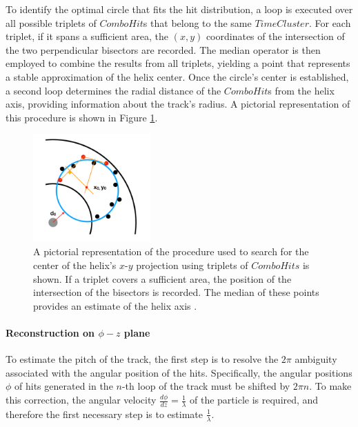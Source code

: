 To identify the optimal circle that fits the hit distribution, 
a loop is executed over all possible triplets of 
$ComboHit$s that belong to the same $TimeCluster$. 
For each triplet, if it spans a sufficient area, the 
$(x, y)$ coordinates of the intersection of the two 
perpendicular bisectors are recorded. The median operator 
is then employed to combine the results from all triplets, 
yielding a point that represents a stable approximation of 
the helix center. Once the circle's center is established, 
a second loop determines the radial distance of the 
$ComboHit$s from the helix axis, providing information 
about the track's radius. A pictorial representation of 
this procedure is shown in Figure \ref{fig:trkpatrec}.
\begin{figure}[!h]
    \centering
    \includegraphics[width =0.4\textwidth]{figures/png/Screenshot_20240810_160341.png}
    \caption[Procedure adopted to search for the center of the $x-y$
    projection of the helix.]{A pictorial representation of the procedure 
    used to search for the center of the helix's $x$-$y$ projection using 
    triplets of $ComboHits$ is shown. If a triplet covers a sufficient area, 
    the position of the intersection of the 
    bisectors is recorded. The median of these points provides an 
    estimate of the helix axis \cite{trkpat}.}
    \label{fig:trkpatrec}
\end{figure}
\paragraph{Reconstruction on $\phi-z$ plane}
To estimate the pitch of the track, the first step 
is to resolve the $2\pi$ ambiguity associated with the 
angular position of the hits. Specifically, the angular 
positions $\phi$ of hits generated in the $n$-th loop of 
the track must be shifted by $2\pi n$. To make this 
correction, the angular velocity $\frac{d\phi}{dz} = \frac{1}{\lambda}$ 
of the particle is required, and therefore the first necessary 
step is to estimate $\frac{1}{\lambda}$.

